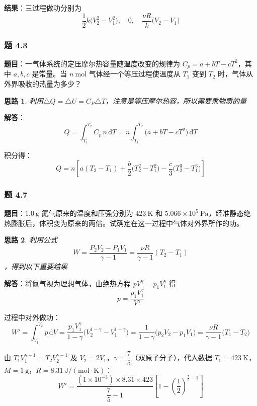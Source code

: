 \documentclass[UTF8]{ctexart}
\newtheorem{thoughts}{思路}[subsection]
\begin{document}
\textbf{结果}：三过程做功分别为
\[
\boxed{\frac{1}{2}k\bigl(V_2^2-V_1^2\bigr),\quad 0,\quad \frac{\nu R}{k}\bigl(V_2-V_1\bigr)}
\]

\subsubsection{题 4.3}

\textbf{题目}：一气体系统的定压摩尔热容量随温度改变的规律为 $C_p=a+bT-cT^2$，其中 $a,b,c$ 是常量。当 $n\ \mathrm{mol}$ 气体经一个等压过程使温度从 $T_1$ 变到 $T_2$ 时，气体从外界吸收的热量为多少？

\begin{thoughts}
  利用$\triangle Q = \triangle U = C_P \triangle T$，注意是等压摩尔热容，所以需要乘物质的量
\end{thoughts}

\textbf{解答}：
\[
Q=\int_{T_1}^{T_2}C_p\,n\,\mathrm{d}T
=n\int_{T_1}^{T_2}\bigl(a+bT-cT^2\bigr)\,\mathrm{d}T
\]

积分得：
\[
\boxed{Q=n\left[a(T_2-T_1)+\frac{b}{2}\bigl(T_2^2-T_1^2\bigr)-\frac{c}{3}\bigl(T_2^3-T_1^3\bigr)\right]}
\]

\subsubsection{题 4.7}

\textbf{题目}：$1.0\ \mathrm{g}$ 氮气原来的温度和压强分别为 $423\ \mathrm{K}$ 和 $5.066\times 10^5\ \mathrm{Pa}$，经准静态绝热膨胀后，体积变为原来的两倍。试确定在这一过程中气体对外界所作的功。

\begin{thoughts}
  利用公式$$W=\frac{P_2V_2-P_1V_1}{\gamma-1}=\frac{\nu R}{\gamma-1} (T_2-T_1)$$，得到以下重要结果
\end{thoughts}

\textbf{解答}：将氮气视为理想气体，由绝热方程 $pV^{\gamma}=p_1V_1^{\gamma}$ 得
\[
p=\frac{p_1V_1^{\gamma}}{V^{\gamma}}
\]

过程中对外做功：
\[
W'=\int_{V_1}^{V_2}p\,\mathrm{d}V
=\frac{p_1V_1^{\gamma}}{1-\gamma}\bigl(V_2^{1-\gamma}-V_1^{1-\gamma}\bigr)
=\frac{1}{1-\gamma}\bigl(p_2V_2-p_1V_1\bigr)
=\frac{\nu R}{\gamma-1}\bigl(T_1-T_2\bigr)
\]

由 $T_1V_1^{\gamma-1}=T_2V_2^{\gamma-1}$ 及 $V_2=2V_1$，$\gamma=\dfrac{7}{5}$（双原子分子），代入数据 $T_1=423\ \mathrm{K}$，$M=1\ \mathrm{g}$，$R=8.31\ \mathrm{J/(mol\cdot K)}$：
\[
W'=\frac{(1\times 10^{-3})\times 8.31\times 423}{\dfrac{7}{5}-1}
\left[1-\left(\frac{1}{2}\right)^{\frac{7}{5}-1}\right]
\]
\end{document}
